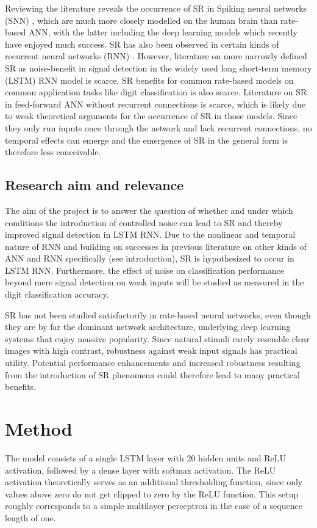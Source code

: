\documentclass{article}
\begin{document}
Reviewing the literature reveals the occurrence of SR in Spiking neural networks (SNN) \cite{guo2009stochastic}, which are much more closely modelled on the human brain than rate-based ANN, with the latter including the deep learning models which recently have enjoyed much success. SR has also been observed in certain kinds of recurrent neural networks (RNN) \cite{krauss2018stochastic, monterola2005noise}. However, literature on more narrowly defined SR as noise-benefit in signal detection in the widely used long short-term memory (LSTM) RNN model is scarce. SR benefits for common rate-based models on common application tasks like digit classification is also scarce. Literature on SR in feed-forward ANN without recurrent connections is scarce, which is likely due to weak theoretical arguments for the occurrence of SR in those models. Since they only run inputs once through the network and lack recurrent connections, no temporal effects can emerge and the emergence of SR in the general form is therefore less conceivable.


\subsection{Research aim and relevance}
The aim of the project is to answer the question of whether and under which conditions the introduction of controlled noise can lead to SR and thereby improved signal detection in LSTM RNN. Due to the nonlinear and temporal nature of RNN and building on successes in previous literature on other kinds of ANN and RNN specifically (see introduction), SR is hypothesized to occur in LSTM RNN. Furthermore, the effect of noise on classification performance beyond mere signal detection on weak inputs will be studied as measured in the digit classification accuracy.

SR has not been studied satisfactorily in rate-based neural networks, even though they are by far the dominant network architecture, underlying deep learning systems that enjoy massive popularity. Since natural stimuli rarely resemble clear images with high contrast, robustness against weak input signals has practical utility. Potential performance enhancements and increased robustness resulting from the introduction of SR phenomena could therefore lead to many practical benefits.



\section{Method}
The model consists of a single LSTM layer with 20 hidden units and ReLU activation, followed by a dense layer with softmax activation. The ReLU activation theoretically serves as an additional thresholding function, since only values above zero do not get clipped to zero by the ReLU function. This setup roughly corresponds to a simple multilayer perceptron in the case of a sequence length of one.
\end{document}
